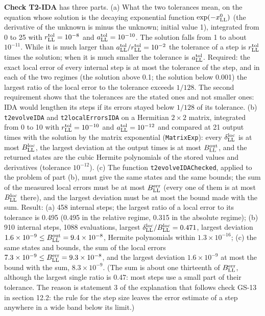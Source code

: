 \documentclass[
  10pt,
]{article}
\begin{document}
\textbf{Check T2-IDA} has three parts. (a) What the two tolerances mean,
on the equation whose solution is the decaying exponential function
\(\exp(-x^0_{\rm LL})\) (the derivative of the unknown is minus the
unknown; initial value 1), integrated from 0 to 25 with
\(r^{\rm tol}_{\rm LL}=10^{-8}\) and \(a^{\rm tol}_{\rm LL}=10^{-10}\).
The solution falls from 1 to about \(10^{-11}\). While it is much larger
than \(a^{\rm tol}_{\rm LL}/r^{\rm tol}_{\rm LL}=10^{-2}\) the tolerance
of a step is \(r^{\rm tol}_{\rm LL}\) times the solution; when it is
much smaller the tolerance is \(a^{\rm tol}_{\rm LL}\). Required: the
exact local error of every internal step is at most the tolerance of the
step, and in each of the two regimes (the solution above 0.1; the
solution below 0.001) the largest ratio of the local error to the
tolerance exceeds \(1/128\). The second requirement shows that the
tolerances are the stated ones and not smaller ones: IDA would lengthen
its steps if its errors stayed below \(1/128\) of its tolerance. (b)
\texttt{t2evolveIDA} and \texttt{t2localErrorsIDA} on a Hermitian
\(2\times2\) matrix, integrated from 0 to 10 with
\(r^{\rm tol}_{\rm LL}=10^{-10}\) and \(a^{\rm tol}_{\rm LL}=10^{-12}\)
and compared at 21 output times with the solution by the matrix
exponential (\texttt{MatrixExp}): every \(\delta^{\rm loc}_{\rm LL}\) is
at most \(B^{\rm loc}_{\rm LL}\), the largest deviation at the output
times is at most \(B^{\rm out}_{\rm LL}\), and the returned states are
the cubic Hermite polynomials of the stored values and derivatives
(tolerance \(10^{-12}\)). (c) The function \texttt{t2evolveIDAChecked},
applied to the problem of part (b), must give the same states and the
same bounds; the sum of the measured local errors must be at most
\(B^{\rm err}_{\rm LL}\) (every one of them is at most
\(B^{\rm loc}_{\rm LL}\) there), and the largest deviation must be at
most the bound made with the sum. Result: (a) 458 internal steps; the
largest ratio of a local error to its tolerance is 0.495 (0.495 in the
relative regime, 0.315 in the absolute regime); (b) 910 internal steps,
1088 evaluations, largest
\(\delta^{\rm loc}_{\rm LL}/B^{\rm loc}_{\rm LL}=0.471\), largest
deviation \(1.6\times10^{-9}\le B^{\rm out}_{\rm LL}=9.4\times10^{-8}\),
Hermite polynomials within \(1.3\times10^{-16}\); (c) the same states
and bounds, the sum of the local errors
\(7.3\times10^{-9}\le B^{\rm err}_{\rm LL}=9.3\times10^{-8}\), and the
largest deviation \(1.6\times10^{-9}\) at most the bound with the sum,
\(8.3\times10^{-9}\). (The sum is about one thirteenth of
\(B^{\rm err}_{\rm LL}\), although the largest single ratio is 0.47:
most steps use a small part of their tolerance. The reason is statement
3 of the explanation that follows check GS-13 in section 12.2: the rule
for the step size leaves the error estimate of a step anywhere in a wide
band below its limit.)
\end{document}
